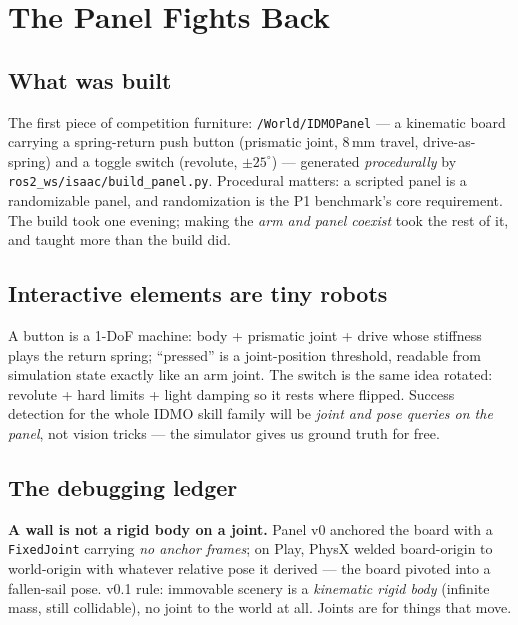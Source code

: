 \chapter{The Panel Fights Back}
\label{ch:panel}

\section{What was built}

The first piece of competition furniture: \texttt{/World/IDMOPanel} --- a kinematic board
carrying a spring-return push button (prismatic joint, 8\,mm travel, drive-as-spring) and a
toggle switch (revolute, $\pm25^\circ$) --- generated \emph{procedurally} by
\texttt{ros2\_ws/isaac/build\_panel.py}. Procedural matters: a scripted panel is a
randomizable panel, and randomization is the P1 benchmark's core requirement. The build took
one evening; making the \emph{arm and panel coexist} took the rest of it, and taught more
than the build did.

\section{Interactive elements are tiny robots}

A button is a 1-DoF machine: body + prismatic joint + drive whose stiffness plays the return
spring; ``pressed'' is a joint-position threshold, readable from simulation state exactly like
an arm joint. The switch is the same idea rotated: revolute + hard limits + light damping so
it rests where flipped. Success detection for the whole IDMO skill family will be \emph{joint
and pose queries on the panel}, not vision tricks --- the simulator gives us ground truth for
free.

\section{The debugging ledger}

\begin{lesson}
\textbf{A wall is not a rigid body on a joint.} Panel v0 anchored the board with a
\texttt{FixedJoint} carrying \emph{no anchor frames}; on Play, PhysX welded board-origin to
world-origin with whatever relative pose it derived --- the board pivoted into a fallen-sail
pose. v0.1 rule: immovable scenery is a \emph{kinematic rigid body} (infinite mass, still
collidable), no joint to the world at all. Joints are for things that move.
\end{lesson}

